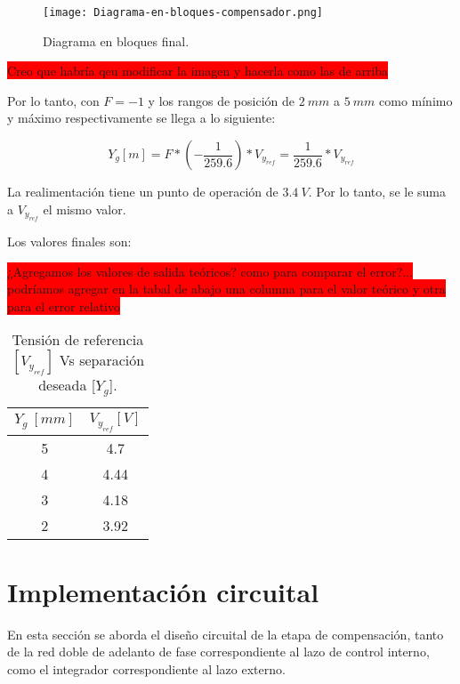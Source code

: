 \begin{figure}[H]
	\centering
	\texttt{[image: Diagrama-en-bloques-compensador.png]}
	\caption{Diagrama en bloques final.}
	\label{fig:diag-bloques-compensador}
\end{figure}

\colorbox{red}{Creo que habría qeu modificar la imagen y hacerla como las de arriba}

\noindent Por lo tanto, con $F=-1$ y los rangos de posición de $2\:mm$ a $5\:mm$ como mínimo y máximo respectivamente se llega a lo siguiente:

\begin{equation} 
	Y_g[m] = F * (-\frac{1}{259.6})*V_{y_{ref}} =\frac{1}{259.6}*V_{y_{ref}} 
\end{equation}

\noindent La realimentación tiene un punto de operación de $3.4\:V$. Por lo tanto, se le suma a $V_{y_{ref}}$ el mismo valor.

\noindent Los valores finales son:

\colorbox{red}{¿Agregamos los valores de salida teóricos? como para comparar el error?... podríamos agregar en la tabal de abajo una columna para el valor teórico y otra para el error relativo}


\begin{table}[H]
	\begin{center}
		\begin{tabular}{| c | c |}
			\hline
			$Y_g\:[mm]$ & $V_{y_{ref}}[V]$\\ \hline
			5 & 4.7\\ \hline
			4 & 4.44 \\ \hline
			3 & 4.18\\ \hline
			2 &	3.92 \\ \hline		
		\end{tabular}
		\caption{Tensión de referencia $[V_{y_{ref}}]$ Vs separación deseada [$Y_g$].}
		\label{tension-ref-vs-separacion-deseada}
	\end{center}
\end{table}

\section{Implementación circuital}

En esta sección se aborda el diseño circuital de la etapa de compensación, tanto de la red doble de adelanto de fase correspondiente al lazo de control interno, como el integrador correspondiente al lazo externo.

